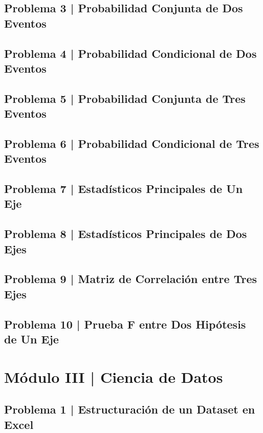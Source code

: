 \documentclass{article}
\begin{document}
\subsection*{Problema 3 | Probabilidad Conjunta de Dos Eventos}

\subsection*{Problema 4 | Probabilidad Condicional de Dos Eventos}

\subsection*{Problema 5 | Probabilidad Conjunta de Tres Eventos}

\subsection*{Problema 6 | Probabilidad Condicional de Tres Eventos}

\subsection*{Problema 7 | Estadísticos Principales de Un Eje}

\subsection*{Problema 8 | Estadísticos Principales de Dos Ejes }

\subsection*{Problema 9 | Matriz de Correlación entre Tres Ejes}

\subsection*{Problema 10 | Prueba F entre Dos Hipótesis de Un Eje}

\clearpage

\section*{Módulo III | Ciencia de Datos}

\subsection*{Problema 1 | Estructuración de un Dataset en Excel}
\end{document}
